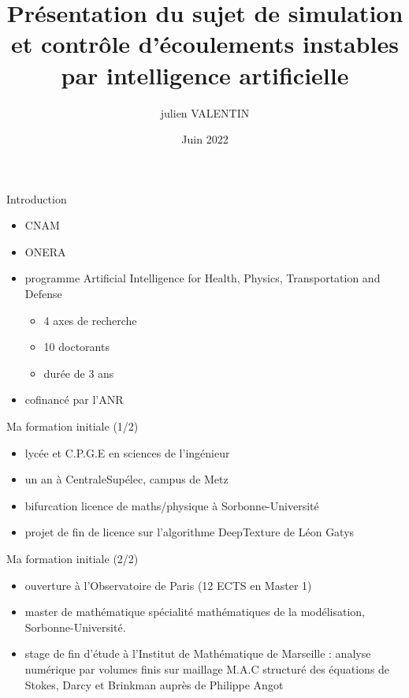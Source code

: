 \documentclass{beamer}
\title{Présentation du sujet de simulation et contrôle d'écoulements instables par intelligence artificielle}
\author{julien VALENTIN}
\date{Juin 2022}
\begin{document}
\maketitle

\begin{frame}{Introduction}
    \begin{itemize}
    \setlength\itemsep{1.5em}
        \item CNAM
        \item ONERA
        \item programme Artificial Intelligence for Health, Physics, Transportation and Defense
            \begin{itemize}
                \item 4 axes de recherche
                \item 10 doctorants
                \item durée de 3 ans
            \end{itemize}
        \item cofinancé par l'ANR
    \end{itemize}
\end{frame}

\begin{frame}{Ma formation initiale (1/2)}
    \begin{itemize}
    \setlength\itemsep{1.15em}
        \item lycée et C.P.G.E en sciences de l'ingénieur
        \item un an à CentraleSupélec, campus de Metz
        \item bifurcation licence de maths/physique à Sorbonne-Université
        \item projet de fin de licence sur l'algorithme DeepTexture de Léon Gatys
    \end{itemize}
\end{frame}

\begin{frame}{Ma formation initiale (2/2)}
    \begin{itemize}
    \setlength\itemsep{1.15em}
    \item ouverture à l'Observatoire de Paris (12 ECTS en Master 1)
    \item master de mathématique spécialité mathématiques de la modélisation, Sorbonne-Université.
    \item stage de fin d'étude à l'Institut de Mathématique de Marseille : analyse numérique par volumes finis sur maillage M.A.C structuré des équations de Stokes, Darcy et Brinkman auprès de Philippe Angot
    \end{itemize}
\end{frame}
\end{document}
